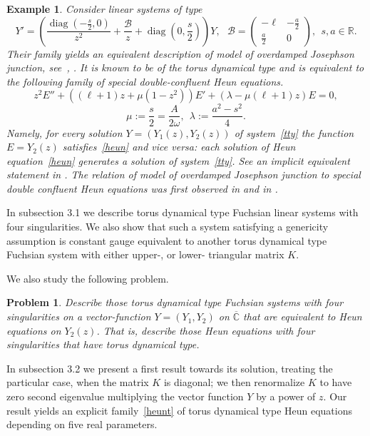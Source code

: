 \documentclass[preprint,12pt]{elsarticle}
\theoremstyle{plain}
\newtheorem{example}[theorem]{Example}
\newtheorem{problem}[theorem]{Problem}
\DeclareMathOperator{\diag}{\mathrm{diag}}
\numberwithin{equation}{section}
\numberwithin{equation}{section}
\begin{document}
\begin{example} Consider linear systems of type 
\begin{equation}\label{tty}
    Y'=\left(\frac{\diag(-\frac s2,0)}{z^2}+\frac{\mathcal{B}}z+\diag(0, \frac s2)\right)Y, \ \ \ 
    \mathcal{B}=\left(\begin{matrix} -\ell &-\frac a2\\ \frac a2 & 0\end{matrix}\right), \ \ s,a\in\mathbb{R}.
\end{equation}
Their family yields an equivalent description of model of overdamped Josephson junction, see~\cite{bkt1,buchstaber2010rotation,buchstaber2015holomorphic, Foote, foott,  IRF}, \cite[subsection 3.2]{bg}.  It is known to be of the torus dynamical type and is equivalent to the following family of special double-confluent Heun equations.
\begin{equation}\label{heun}
    z^2E''+((\ell+1)z+\mu(1-z^2))E'+(\lambda-\mu(\ell+1)z)E=0,
\end{equation}
$$\mu:=\frac s2=\frac A{2\omega}, \ \ \lambda:=\frac{a^2-s^2}4.$$
Namely, for every solution $Y=(Y_1(z),Y_2(z))$ of system~\eqref{tty} the function $E=Y_2(z)$ satisfies~\eqref{heun} and vice versa: each solution of Heun equation~\eqref{heun} generates a solution of system~\eqref{tty}. See an implicit equivalent statement in \cite[subsection 3.2, p. 3869]{bg}. The relation of model of overdamped Josephson junction to special double confluent Heun equations was first observed  in \cite{tert2} and in \cite{bt0}. 
\end{example}

In subsection 3.1 we describe torus dynamical type Fuchsian linear systems with four singularities. We also show that such a system satisfying a genericity assumption is constant gauge equivalent to another torus dynamical type Fuchsian system with either upper-, or lower- triangular matrix $K$. 

We  also study the following problem. 

\begin{problem} Describe those torus dynamical type Fuchsian systems with four singularities on a vector-function 
$Y=(Y_1, Y_2)$ on $\overline{\mathbb{C}}$ 
 that are equivalent to Heun equations on $Y_2(z)$.  
That is, describe those 
Heun equations with four singularities that have torus dynamical type.
\end{problem}

In subsection 3.2 we present a first result towards its solution, treating the particular case, when the matrix 
$K$ is diagonal; we then renormalize $K$ to have zero second eigenvalue  multiplying the vector function $Y$ by a power of $z$. Our result yields an explicit  family~\eqref{heunt} 
of torus dynamical type Heun equations depending on five real parameters. 
\end{document}
